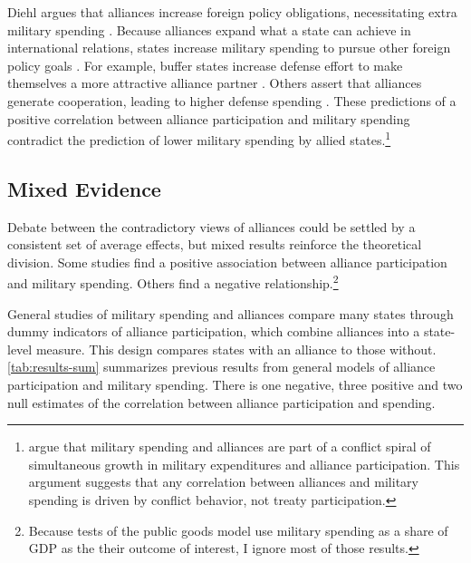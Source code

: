 \documentclass[12pt]{article}
\begin{document}
Diehl argues that alliances increase foreign policy obligations, necessitating extra military spending \citep{Diehl1994}.
Because alliances expand what a state can achieve in international relations, states increase military spending to pursue other foreign policy goals \cite{MorganPalmer2006}.
For example, buffer states increase defense effort to make themselves a more attractive alliance partner \citep{Horowitzetal2017}.
Others assert that alliances generate cooperation, leading to higher defense spending \citep{Palmer1990, QuirozFlores2011}. 
These predictions of a positive correlation between alliance participation and military spending contradict the prediction of lower military spending by allied states.\footnote{
\citet{SeneseVasquez2008} argue that military spending and alliances are part of a conflict spiral of simultaneous growth in military expenditures and alliance participation. 
This argument suggests that any correlation between alliances and military spending is driven by conflict behavior, not treaty participation.
}


\subsection{Mixed Evidence} 


Debate between the contradictory views of alliances could be settled by a consistent set of average effects, but mixed results reinforce the theoretical division.
Some studies find a positive association between alliance participation and military spending. 
Others find a negative relationship.\footnote{
Because tests of the public goods model use military spending as a share of GDP as the their outcome of interest, I ignore most of those results.} 


General studies of military spending and alliances compare many states through dummy indicators of alliance participation, which combine alliances into a state-level measure. 
This design compares states with an alliance to those without.
\autoref{tab:results-sum} summarizes previous results from general models of alliance participation and military spending. 
There is one negative, three positive and two null estimates of the correlation between alliance participation and spending. 
\end{document}

